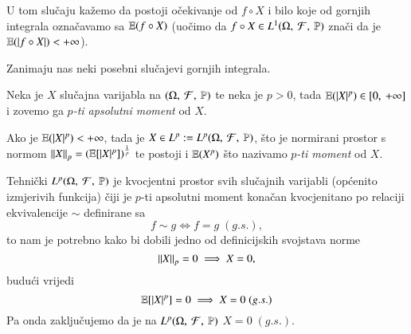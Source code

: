 \begin{figure}[H]
    \centering
\end{figure}
U tom slu\v caju ka\v zemo da postoji o\v cekivanje od $f \circ X$ i bilo koje od gornjih integrala ozna\v cavamo sa $\mathbb{E}({f \circ X})$
(uo\v cimo da $f \circ X \in L^1 (\Omega, \: \mathcal{F}, \: \mathbb{P})$ zna\v ci da je $\mathbb{E}({|f \circ X|}) < +\infty$).

Zanimaju nas neki posebni slu\v cajevi gornjih integrala.

\begin{defn}    \label{defn:5.11-4}
    Neka je $X$ slu\v cajna varijabla  na $(\Omega, \: \mathcal{F}, \: \mathbb{P})$ te neka je $p > 0$, tada $\mathbb{E}({|X|^p}) \in [{0}, \:{+\infty}]$ i zovemo ga \emph{$p$-ti apsolutni moment} od $X$.
    
    Ako je $\mathbb{E}({|X|^p}) < +\infty$, tada je $X \in L^p := L^p (\Omega, \: \mathcal{F}, \: \mathbb{P})$, \v sto je normirani prostor s normom $\left\lVert {X} \right\rVert_p = (\mathbb{E} [|X|^p])^{\frac{1}{p}}$ te postoji i $\mathbb{E}({X^p})$ \v sto nazivamo \emph{$p$-ti moment} od $X$.
\end{defn}

\begin{nap} \label{nap:5.11-5}
    Tehni\v cki $L^p (\Omega, \: \mathcal{F}, \: \mathbb{P})$ je kvocjentni prostor svih slu\v cajnih varijabli (op\' cenito izmjerivih funkcija) \v ciji je $p$-ti apsolutni moment kona\v can kvocjenitano po relaciji ekvivalencije $\sim$ definirane sa
    \begin{equation*}
        f \sim g \iff f = g \; (g.s.),
    \end{equation*}
    to nam je potrebno kako bi dobili jedno od definicijskih svojstava norme
    \begin{equation*}
        \left\lVert {X} \right\rVert_p = 0 \implies X = 0,
    \end{equation*}
    budu\' ci vrijedi
    \begin{equation*}
        \mathbb{E} [|X|^p] = 0 \implies X = 0 \; (g.s.)
    \end{equation*}
    Pa onda zaklju\v cujemo da je na $L^p (\Omega, \: \mathcal{F}, \: \mathbb{P})$ $X = 0 \; (g.s.)$.
\end{nap}

